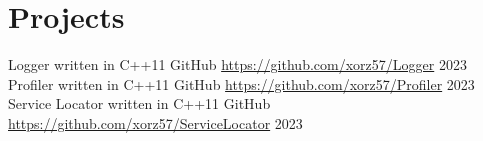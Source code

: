\section{Projects}

\begin{itemize}
    \cventry
        {Logger written in C++11}
        {GitHub}
        {\url{https://github.com/xorz57/Logger}}
        {2023}
    \cventry
        {Profiler written in C++11}
        {GitHub}
        {\url{https://github.com/xorz57/Profiler}}
        {2023}
    \cventry
        {Service Locator written in C++11}
        {GitHub}
        {\url{https://github.com/xorz57/ServiceLocator}}
        {2023}
\end{itemize}
